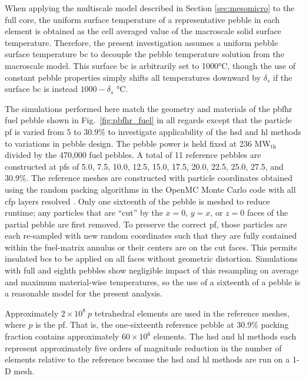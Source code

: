 When applying the multiscale model described in Section \ref{sec:mesomicro} to the full core, the uniform surface temperature of a representative pebble in each element is obtained as the cell averaged value of the macroscale solid surface temperature. Therefore, the present investigation assumes a uniform pebble surface temperature \gls{bc} to decouple the pebble temperature solution from the macroscale model. This surface \gls{bc} is arbitrarily set to 1000\si{\celsius}, though the use of constant pebble properties simply shifts all temperatures downward by \(\delta_s\) if the surface \gls{bc} is instead \(1000-\delta_s\) \si{\celsius}.

The simulations performed here match the geometry and materials of the \gls{pbfhr} fuel pebble shown in Fig.\ \ref{fig:pbfhr_fuel} in all regards except that the particle \gls{pf} is varied from \(5\) to \(30.9\)\% to investigate applicability of the \gls{hsd} and \gls{hl} methods to variations in pebble design. The pebble power is held fixed at 236 MW$_\text{th}$ divided by the 470,000 fuel pebbles. A total of 11 reference pebbles are constructed at \glspl{pf} of 5.0, 7.5, 10.0, 12.5, 15.0, 17.5, 20.0, 22.5, 25.0, 27.5, and 30.9\%. The reference meshes are constructed with particle coordinates obtained using the random packing algorithms in the OpenMC Monte Carlo code with all \gls{cfp} layers resolved \cite{jodrey}. Only one sixteenth of the pebble is meshed to reduce runtime; any particles that are ``cut'' by the \(x=0\), \(y=x\), or \(z=0\) faces of the partial pebble are first removed. To preserve the correct \gls{pf}, those particles are each re-sampled with new random coordinates such that they are fully contained within the fuel-matrix annulus or their centers are on the cut faces. This permits insulated \glspl{bc} to be applied on all faces without geometric distortion. Simulations with full and eighth pebbles show negligible impact of this resampling on average and maximum material-wise temperatures, so the use of a sixteenth of a pebble is a reasonable model for the present analysis. 

Approximately \(2\times10^8\ p\) tetrahedral elements are used in the reference meshes, where \(p\) is the \gls{pf}. That is, the one-sixteenth reference pebble at 30.9\% packing fraction contains approximately \(60\times10^6\) elements. The \gls{hsd} and \gls{hl} methods each represent approximately five orders of magnitude reduction in the number of elements relative to the reference because the \gls{hsd} and \gls{hl} methods are run on a 1-D mesh.

